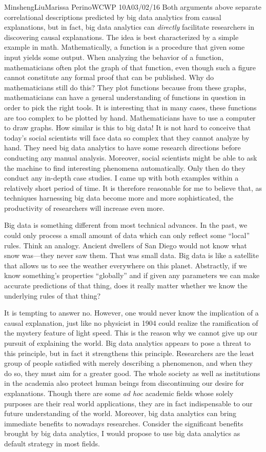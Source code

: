 \documentclass[12pt,letterpaper]{article}
\begin{document}
\begin{mla}{Minsheng}{Liu}{Marissa Perino}{WCWP 10A}{03/02/16}
Both arguments above separate correlational descriptions predicted by
big data analytics from causal explanations, but in fact, big data
analytics can \emph{directly} facilitate researchers in discovering
causal explanations. The idea is best characterized by a simple example
in math. Mathematically, a function is a procedure that given some input
yields some output. When analyzing the behavior of a function,
mathematicians often plot the graph of that function, even though such a
figure cannot constitute any formal proof that can be published. Why do
mathematicians still do this? They plot functions because from these
graphs, mathematicians can have a general understanding of functions in
question in order to pick the right tools. It is interesting that in
many cases, these functions are too complex to be plotted by hand.
Mathematicians have to use a computer to draw graphs. How similar is
this to big data! It is not hard to conceive that today's social
scientists will face data so complex that they cannot analyze by hand.
They need big data analytics to have some research directions before
conducting any manual analysis. Moreover, social scientists might be
able to ask the machine to find interesting phenomena automatically.
Only then do they conduct any in-depth case studies. I came up with both
examples within a relatively short period of time. It is therefore
reasonable for me to believe that, as techniques harnessing big data
become more and more sophisticated, the productivity of researchers will
increase even more.

Big data is something different from most technical advances. In the
past, we could only process a small amount of data which can only
reflect some ``local'' rules. Think an analogy. Ancient dwellers of San
Diego would not know what snow was---they never saw them. That was small
data. Big data is like a satellite that allows us to see the weather
everywhere on this planet. Abstractly, if we know something's properties
``globally'' and if given any parameters we can make accurate
predictions of that thing, does it really matter whether we know the
underlying rules of that thing?

It is tempting to answer no. However, one would never know the
implication of a causal explanation, just like no physicist in 1904
could realize the ramification of the mystery feature of light speed.
This is the reason why we cannot give up our pursuit of explaining the
world. Big data analytics appears to pose a threat to this principle,
but in fact it strengthens this principle. Researchers are the least
group of people satisfied with merely describing a phenomenon, and when
they do so, they must aim for a greater good. The whole society as well
as institutions in the academia also protect human beings from
discontinuing our desire for explanations. Though there are some
\emph{ad hoc} academic fields whose solely purposes are their real world
applications, they are in fact indispensable to our future understanding
of the world. Moreover, big data analytics can bring immediate benefits
to nowadays researches. Consider the significant benefits brought by big
data analytics, I would propose to use big data analytics as default
strategy in most fields.


\end{mla}
\end{document}
